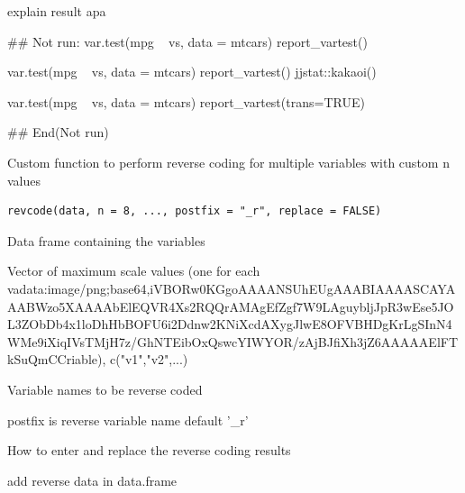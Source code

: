 \documentclass[a4paper]{book}
\begin{document}
%
\begin{Value}
explain result apa
\end{Value}
%
\begin{Examples}
\begin{ExampleCode}
\#\# Not run: 
var.test(mpg ~ vs, data = mtcars)%
     report_vartest()

var.test(mpg ~ vs, data = mtcars)%
     report_vartest() %
     jjstat::kakaoi()

var.test(mpg ~ vs, data = mtcars)%
report_vartest(trans=TRUE)


## End(Not run)
\end{ExampleCode}
\end{Examples}
%
\begin{Description}
Custom function to perform reverse coding for multiple variables with custom n values
\end{Description}
%
\begin{Usage}
\begin{verbatim}
revcode(data, n = 8, ..., postfix = "_r", replace = FALSE)
\end{verbatim}
\end{Usage}
%
\begin{Arguments}
\begin{ldescription}
\item[\code{data}] Data frame containing the variables

\item[\code{n}] Vector of maximum scale values (one for each vadata:image/png;base64,iVBORw0KGgoAAAANSUhEUgAAABIAAAASCAYAAABWzo5XAAAAbElEQVR4Xs2RQQrAMAgEfZgf7W9LAguybljJpR3wEse5JOL3ZObDb4x1loDhHbBOFU6i2Ddnw2KNiXcdAXygJlwE8OFVBHDgKrLgSInN4WMe9iXiqIVsTMjH7z/GhNTEibOxQswcYIWYOR/zAjBJfiXh3jZ6AAAAAElFTkSuQmCCriable), c("v1","v2",...)

\item[\code{...}] Variable names to be reverse coded

\item[\code{postfix}] postfix is reverse variable name default '\_r'

\item[\code{replace}] How to enter and replace the reverse coding results
\end{ldescription}
\end{Arguments}
%
\begin{Value}
add reverse data in data.frame
\end{Value}
\end{document}

